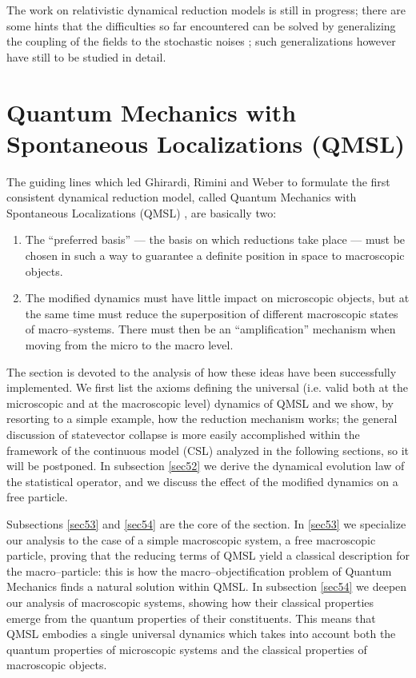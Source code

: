 \documentclass[10pt,a4paper]{article}
\begin{document}
The work on relativistic dynamical reduction models is still in
progress; there are some hints that the difficulties so far
encountered can be solved by generalizing the coupling of the
fields to the stochastic noises \cite{ppo1, ppo2, bgrel}; such
generalizations however have still to be studied in detail.



\section{Quantum Mechanics with Spontaneous Localizations (QMSL)}
\label{sec5}

 The guiding lines which led Ghirardi, Rimini and
Weber to formulate the first consistent dynamical reduction model,
called Quantum Mechanics with Spontaneous Localizations (QMSL)
\cite{heid, grw}, are basically two:
\begin{enumerate}
\item The ``preferred basis'' --- the basis on which
reductions take place --- must be chosen in such a way to guarantee a
definite position in space to macroscopic objects.
\item The modified dynamics must have little impact on microscopic
objects, but at the same time must reduce the superposition of
different macroscopic states of macro--systems. There must then be
an ``amplification'' mechanism when moving from the micro to the
macro level.
\end{enumerate}
The section is devoted to the analysis of how these ideas have
been successfully implemented. We first list the axioms defining
the universal (i.e. valid both at the microscopic and at the
macroscopic level) dynamics of QMSL and we show, by resorting to a
simple example, how the reduction mechanism works; the general
discussion of statevector collapse is more easily accomplished
within the framework of the continuous model (CSL) analyzed in the
following sections, so it will be postponed. In subsection
\ref{sec52} we derive the dynamical evolution law of the
statistical operator, and we discuss the effect of the modified
dynamics on a free particle.

Subsections \ref{sec53} and \ref{sec54} are the core of the
section. In \ref{sec53} we specialize our analysis to the case of
a simple macroscopic system, a free macroscopic particle, proving
that the reducing terms of QMSL yield a classical description for
the macro--particle: this is how the macro--objectification
problem of Quantum Mechanics finds a natural solution within QMSL.
In subsection \ref{sec54} we deepen our analysis of macroscopic
systems, showing how their classical properties emerge from the
quantum properties of their constituents. This means that QMSL
embodies a single universal dynamics which takes into account both
the quantum properties of microscopic systems and the classical
properties of macroscopic objects.
\end{document}
